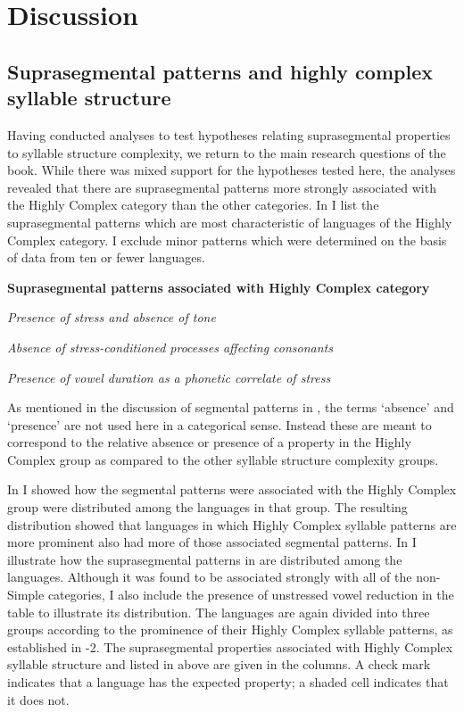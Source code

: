 \section{Discussion}\label{sec:5.5}
\subsection{Suprasegmental patterns and highly complex syllable structure}\label{sec:5.5.1}

  Having conducted analyses to test hypotheses relating suprasegmental properties to syllable structure complexity, we return to the main research questions of the book. While there was mixed support for the hypotheses tested here, the analyses revealed that there are suprasegmental patterns more strongly associated with the Highly Complex category than the other categories. In  I list the suprasegmental patterns which are most characteristic of languages of the Highly Complex category. I exclude minor patterns which were determined on the basis of data from ten or fewer languages.

\ea\label{ex:5.27}
  \textbf{Suprasegmental patterns associated with Highly Complex category}

\textit{Presence of stress and absence of tone}

\textit{Absence of stress-conditioned processes affecting consonants}

\textit{Presence of vowel duration as a phonetic correlate of stress}
\z

  As mentioned in the discussion of segmental patterns in , the terms ‘absence’ and ‘presence’ are not used here in a categorical sense. Instead these are meant to correspond to the relative absence or presence of a property in the Highly Complex group as compared to the other syllable structure complexity groups.

  In  I showed how the segmental patterns were associated with the Highly Complex group were distributed among the languages in that group. The resulting distribution showed that languages in which Highly Complex syllable patterns are more prominent also had more of those associated segmental patterns. In  I illustrate how the suprasegmental patterns in  are distributed among the languages. Although it was found to be associated strongly with all of the non-Simple categories, I also include the presence of unstressed vowel reduction in the table to illustrate its distribution. The languages are again divided into three groups according to the prominence of their Highly Complex syllable patterns, as established in -2. The suprasegmental properties associated with Highly Complex syllable structure and listed in  above are given in the columns. A check mark indicates that a language has the expected property; a shaded cell indicates that it does not. 

